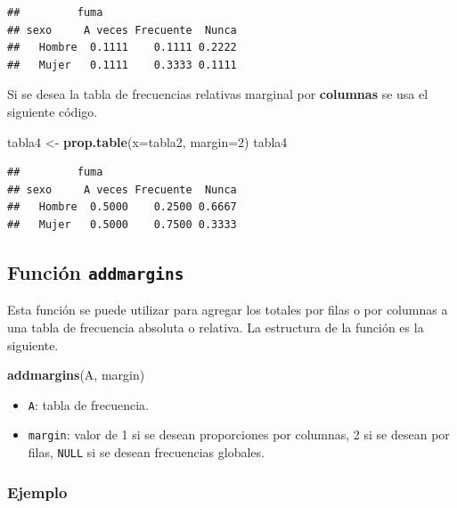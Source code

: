 \documentclass[10pt,]{krantz}
\makeatletter
\newenvironment{Shaded}{\begin{snugshade}}{\end{snugshade}}
\newcommand{\KeywordTok}[1]{\textcolor[rgb]{0.13,0.29,0.53}{\textbf{#1}}}
\newcommand{\DataTypeTok}[1]{\textcolor[rgb]{0.13,0.29,0.53}{#1}}
\newcommand{\DecValTok}[1]{\textcolor[rgb]{0.00,0.00,0.81}{#1}}
\newcommand{\StringTok}[1]{\textcolor[rgb]{0.31,0.60,0.02}{#1}}
\newcommand{\NormalTok}[1]{#1}
\providecommand{\tightlist}{%
  \setlength{\itemsep}{0pt}\setlength{\parskip}{0pt}}
\newenvironment{kframe}{%
\medskip{}
\setlength{\fboxsep}{.8em}
 \def\at@end@of@kframe{}%
 \ifinner\ifhmode%
  \def\at@end@of@kframe{\end{minipage}}%
  \begin{minipage}{\columnwidth}%
 \fi\fi%
 \def\FrameCommand##1{\hskip\@totalleftmargin \hskip-\fboxsep
 \colorbox{shadecolor}{##1}\hskip-\fboxsep
     \hskip-\linewidth \hskip-\@totalleftmargin \hskip\columnwidth}%
 \MakeFramed {\advance\hsize-\width
   \@totalleftmargin\z@ \linewidth\hsize
   \@setminipage}}%
 {\par\unskip\endMakeFramed%
 \at@end@of@kframe}
\renewenvironment{Shaded}{\begin{kframe}}{\end{kframe}}
\makeatother
\begin{document}
\begin{verbatim}
##         fuma
## sexo     A veces Frecuente  Nunca
##   Hombre  0.1111    0.1111 0.2222
##   Mujer   0.1111    0.3333 0.1111
\end{verbatim}

Si se desea la tabla de frecuencias relativas marginal por
\textbf{columnas} se usa el siguiente código.

\begin{Shaded}
\begin{Highlighting}[]
\NormalTok{tabla4 <-}\StringTok{ }\KeywordTok{prop.table}\NormalTok{(}\DataTypeTok{x=}\NormalTok{tabla2, }\DataTypeTok{margin=}\DecValTok{2}\NormalTok{)}
\NormalTok{tabla4}
\end{Highlighting}
\end{Shaded}

\begin{verbatim}
##         fuma
## sexo     A veces Frecuente  Nunca
##   Hombre  0.5000    0.2500 0.6667
##   Mujer   0.5000    0.7500 0.3333
\end{verbatim}

\subsection{\texorpdfstring{Función \texttt{addmargins}
}{Función addmargins }}\label{funcion-addmargins}

Esta función se puede utilizar para agregar los totales por filas o por
columnas a una tabla de frecuencia absoluta o relativa. La estructura de
la función es la siguiente.

\begin{Shaded}
\begin{Highlighting}[]
\KeywordTok{addmargins}\NormalTok{(A, margin)}
\end{Highlighting}
\end{Shaded}

\begin{itemize}
\tightlist
\item
  \texttt{A}: tabla de frecuencia.
\item
  \texttt{margin}: valor de 1 si se desean proporciones por columnas, 2
  si se desean por filas, \texttt{NULL} si se desean frecuencias
  globales.
\end{itemize}

\subsubsection*{Ejemplo}\label{ejemplo-12}
\end{document}
